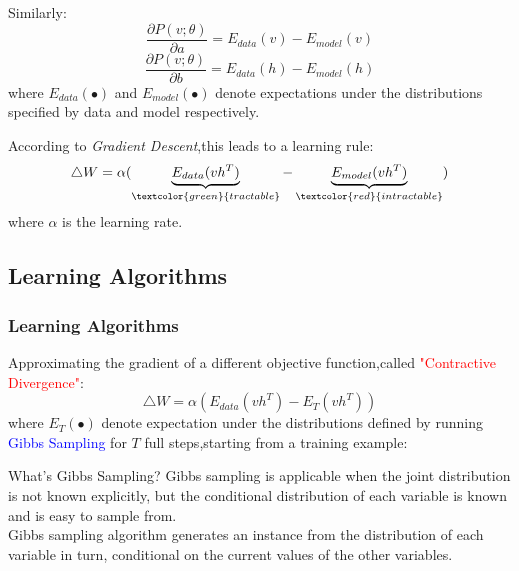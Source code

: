 \documentclass{beamer}
\begin{document}
\begin{CJK*}{UTF8}{gbsn}
\begin{frame}[allowframebreaks]
Similarly:
\begin{equation}
\frac{\partial P(v;\theta)}{\partial a}=E_{data}(v)-E_{model}(v)
\end{equation}
\begin{equation}
\frac{\partial P(v;\theta)}{\partial b}=E_{data}(h)-E_{model}(h)
\end{equation}
where $E_{data}(\bullet)$ and $E_{model}(\bullet)$ denote expectations under the distributions specified by data and model respectively.

According to \emph{Gradient Descent},this leads to a learning rule:
\begin{equation}
\triangle W=\alpha(\underbrace{E_{data}(vh^T)}_{\textcolor{green}{tractable}}-\underbrace{E_{model}(vh^T)}_{\textcolor{red}{intractable}})
\end{equation}
where $\alpha$ is the learning rate.
\end{frame}

\subsection{Learning Algorithms}
\begin{frame}[allowframebreaks]\frametitle{Learning Algorithms}
Approximating the gradient of a different objective function,called \textcolor{red}{"Contractive Divergence"}:
\begin{equation}
\triangle W=\alpha(E_{data}(vh^T)-E_{T}(vh^T))
\end{equation}
where $E_{T}(\bullet)$ denote expectation under the distributions defined by running \textcolor{blue}{Gibbs Sampling} for $T$ full steps,starting from a training example:

\begin{block}{What's Gibbs Sampling?}
Gibbs sampling is applicable when the joint distribution is not known explicitly, but the conditional distribution of each variable is known and is easy to sample from.\\
Gibbs sampling algorithm generates an instance from the distribution of each variable in turn, conditional on the current values of the other variables.
\end{block}


\end{frame}
\end{CJK*}
\end{document}
